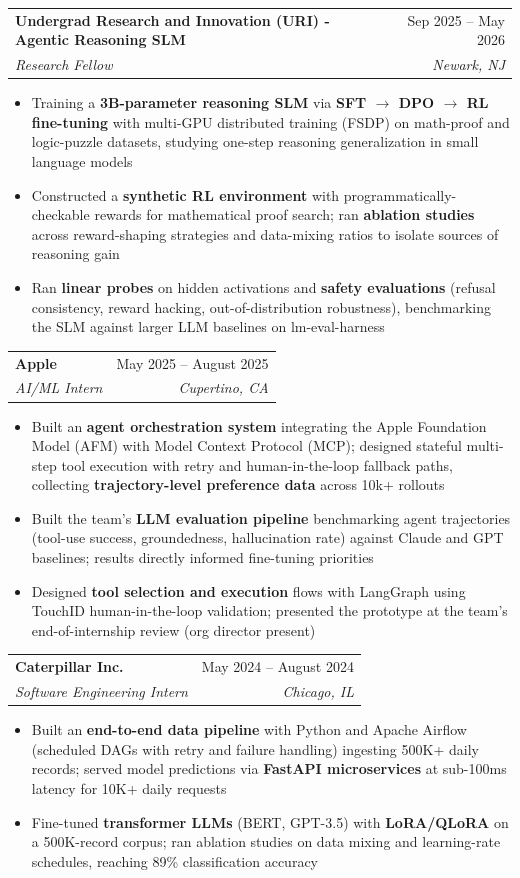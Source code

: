 \documentclass[letterpaper,10pt]{article}
\makeatletter
\newcommand{\resumeItem}[1]{
  \item\small{
    {#1 \vspace{-3pt}}
  }
}
\newcommand{\resumeSubheading}[4]{
  \vspace{-3pt}\item
    \begin{tabular*}{0.97\textwidth}[t]{l@{\extracolsep{\fill}}r}
      \textbf{#1} & #2 \\
      \textit{\small#3} & \textit{\small #4} \\
    \end{tabular*}\vspace{-9pt}
}
\newcommand{\resumeItemListStart}{\begin{itemize}}
\newcommand{\resumeItemListEnd}{\end{itemize}\vspace{-7pt}}
\makeatother
\begin{document}
\resumeSubheading
{Undergrad Research and Innovation (URI) - Agentic Reasoning SLM}{Sep 2025 -- May 2026}
{Research Fellow}{Newark, NJ}
\vspace{5pt}
\resumeItemListStart
\resumeItem{Training a \textbf{3B-parameter reasoning SLM} via \textbf{SFT $\rightarrow$ DPO $\rightarrow$ RL fine-tuning} with multi-GPU distributed training (FSDP) on math-proof and logic-puzzle datasets, studying one-step reasoning generalization in small language models}
\resumeItem{Constructed a \textbf{synthetic RL environment} with programmatically-checkable rewards for mathematical proof search; ran \textbf{ablation studies} across reward-shaping strategies and data-mixing ratios to isolate sources of reasoning gain}
\resumeItem{Ran \textbf{linear probes} on hidden activations and \textbf{safety evaluations} (refusal consistency, reward hacking, out-of-distribution robustness), benchmarking the SLM against larger LLM baselines on lm-eval-harness}
\resumeItemListEnd
\vspace{5pt}

\resumeSubheading
{Apple}{May 2025 -- August 2025}
{AI/ML Intern}{Cupertino, CA}
\vspace{5pt}
\resumeItemListStart
\resumeItem{Built an \textbf{agent orchestration system} integrating the Apple Foundation Model (AFM) with Model Context Protocol (MCP); designed stateful multi-step tool execution with retry and human-in-the-loop fallback paths, collecting \textbf{trajectory-level preference data} across 10k+ rollouts}
\resumeItem{Built the team's \textbf{LLM evaluation pipeline} benchmarking agent trajectories (tool-use success, groundedness, hallucination rate) against Claude and GPT baselines; results directly informed fine-tuning priorities}
\resumeItem{Designed \textbf{tool selection and execution} flows with LangGraph using TouchID human-in-the-loop validation; presented the prototype at the team's end-of-internship review (org director present)}
\resumeItemListEnd
\vspace{5pt}



\resumeSubheading
{Caterpillar Inc.}{May 2024 -- August 2024}
{Software Engineering Intern}{Chicago, IL}
\vspace{5pt}
\resumeItemListStart
\resumeItem{Built an \textbf{end-to-end data pipeline} with Python and Apache Airflow (scheduled DAGs with retry and failure handling) ingesting 500K+ daily records; served model predictions via \textbf{FastAPI microservices} at sub-100ms latency for 10K+ daily requests}
\resumeItem{Fine-tuned \textbf{transformer LLMs} (BERT, GPT-3.5) with \textbf{LoRA/QLoRA} on a 500K-record corpus; ran ablation studies on data mixing and learning-rate schedules, reaching 89\% classification accuracy}
\resumeItemListEnd
\end{document}
